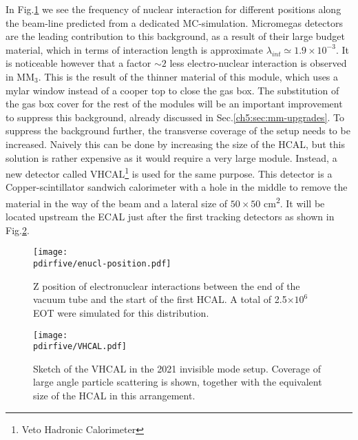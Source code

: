 In Fig.\ref{fig:enucl-position} we see the frequency of nuclear interaction for different positions along the beam-line predicted from a dedicated MC-simulation. Micromegas detectors are the leading contribution to this background, as a result of their large budget material, which in terms of interaction length is approximate $\lambda_{int} \simeq 1.9 \times 10^{-3}$. It is noticeable however that a factor $\sim 2$ less electro-nuclear interaction is observed in MM$_3$. This is the result of the thinner material of this module, which uses a mylar window instead of a cooper top to close the gas box. The substitution of the gas box cover for the rest of the modules will be an important improvement to suppress this background, already discussed in Sec.\ref{ch5:sec:mm-upgrades}. To suppress the background further, the transverse coverage of the setup needs to be increased. Naively this can be done by increasing the size of the HCAL, but this solution is rather expensive as it would require a very large module. Instead, a new detector called VHCAL\footnote{Veto Hadronic Calorimeter} is used for the same purpose. This detector is a Copper-scintillator sandwich calorimeter with a hole in the middle to remove the material in the way of the beam and a lateral size of $50\times50$ \si{\centi\meter\squared}. It will be located upstream the ECAL just after the first tracking detectors as shown in Fig.\ref{fig:vhcal}.
\begin{figure}[bth!]
  \centering
  \texttt{[image: \\pdirfive/enucl-position.pdf]}
  \caption[electronuclear interaction position]{Z position of electronuclear interactions between the end of the vacuum tube and the start of the first HCAL. A total of 2.5$\times 10^6$ EOT were simulated for this distribution.}
  \label{fig:enucl-position}
\end{figure}

\begin{figure}[bth!]
  \centering
  \texttt{[image: \\pdirfive/VHCAL.pdf]}
  \caption[Sketch of VHCAL in invisible mode setup 2021]{Sketch of the VHCAL in the 2021 invisible mode setup. Coverage of large angle particle scattering is shown, together with the equivalent size of the HCAL in this arrangement.}
  \label{fig:vhcal}
\end{figure}

